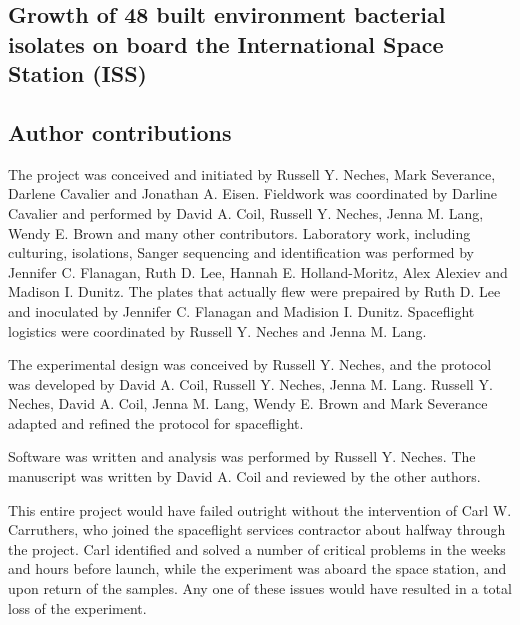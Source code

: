 \begin{refsection}

\chapter{Growth of 48 built environment bacterial isolates on board the International Space Station (ISS)}


\section{Author contributions}

The project was conceived and initiated by Russell Y. Neches, Mark
Severance, Darlene Cavalier and Jonathan A. Eisen. Fieldwork was
coordinated by Darline Cavalier and performed by David A. Coil,
Russell Y. Neches, Jenna M. Lang, Wendy E. Brown and many other
contributors. Laboratory work, including culturing, isolations, Sanger 
sequencing and identification was performed by Jennifer C. Flanagan,
Ruth D. Lee, Hannah E. Holland-Moritz, Alex Alexiev and Madison I.
Dunitz. The plates that actually flew were prepaired by Ruth D. Lee
and inoculated by Jennifer C. Flanagan and Madision I. Dunitz. 
Spaceflight logistics were coordinated by Russell Y. Neches and Jenna
M. Lang.

The experimental design was conceived by Russell Y. Neches, and the
protocol was developed by David A. Coil, Russell Y. Neches, Jenna M.
Lang. Russell Y. Neches, David A. Coil, Jenna M. Lang, Wendy E. Brown
and Mark Severance adapted and refined the protocol for spaceflight.

Software was written and analysis was performed by Russell Y. Neches.
The manuscript was written by David A. Coil and reviewed by the
other authors.

This entire project would have failed outright without the
intervention of Carl W. Carruthers, who joined the spaceflight
services contractor about halfway through the project. Carl identified
and solved a number of critical problems in the weeks and hours before
launch, while the experiment was aboard the space station, and upon
return of the samples. Any one of these issues would have resulted in
a total loss of the experiment.



\end{refsection}
